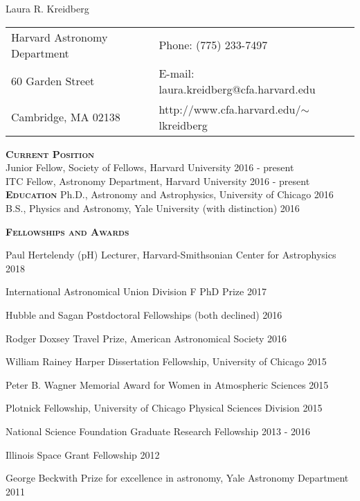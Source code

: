 \documentclass[12pt,letterpaper]{article}
\def\name{Laura R. Kreidberg}
\begin{document}
\sloppy

{\LARGE \name}


\vspace{3 mm}

\begin{tabular}{@{}p{4.0in}@{}p{5.0in}}
Harvard Astronomy Department         & Phone: (775) 233-7497 \\
60 Garden Street                     & E-mail: laura.kreidberg@cfa.harvard.edu\\ 
Cambridge, MA 02138                  & http://www.cfa.harvard.edu/$\sim$lkreidberg \\ 
\end{tabular}

\vspace{8mm}

\textbf{\textsc{Current Position}}\\
Junior Fellow, Society of Fellows, Harvard University \hfill 2016 - present\\
ITC Fellow, Astronomy Department, Harvard University \hfill 2016 - present\\


\textbf{\textsc{Education}}
Ph.D., Astronomy and Astrophysics, University of Chicago \hfill 2016\\
B.S., Physics and Astronomy, Yale University (with distinction) \hfill 2016 

\vspace{3mm}
\textbf{\textsc{Fellowships and Awards}}
\begin{compactitem}[]
\item Paul Hertelendy (pH) Lecturer, Harvard-Smithsonian Center for Astrophysics \hfill 2018 
\item International Astronomical Union Division F PhD Prize \hfill 2017
\item Hubble and Sagan Postdoctoral Fellowships (both declined) \hfill 2016
\item Rodger Doxsey Travel Prize, American Astronomical Society \hfill 2016
\item William Rainey Harper Dissertation Fellowship, University of Chicago \hfill 2015
\item Peter B. Wagner Memorial Award for Women in Atmospheric Sciences \hfill 2015
\item Plotnick Fellowship, University of Chicago Physical Sciences Division \hfill 2015
\item National Science Foundation Graduate Research Fellowship \hfill 2013 - 2016
\item Illinois Space Grant Fellowship \hfill 2012
\item George Beckwith Prize for excellence in astronomy, Yale Astronomy Department \hfill2011
\end{compactitem}
\vspace{3mm}
\end{document}
